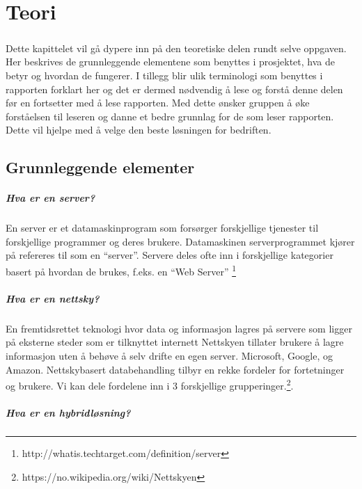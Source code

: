 \chapter{Teori}
\paragraph{} Dette kapittelet vil gå dypere inn på den teoretiske delen rundt selve oppgaven. Her beskrives de grunnleggende elementene som benyttes i prosjektet, hva de betyr og hvordan de fungerer. I tillegg blir ulik terminologi som benyttes i rapporten forklart her og det er dermed nødvendig å lese og forstå denne delen før en fortsetter med å lese rapporten. Med dette ønsker gruppen å øke forståelsen til leseren og danne et bedre grunnlag for de som leser rapporten. Dette vil hjelpe med å velge den beste løsningen for bedriften.
\section{Grunnleggende elementer}
\paragraph{Hva er en server?} 
En server er et datamaskinprogram som forsørger forskjellige tjenester til forskjellige programmer og deres brukere. Datamaskinen serverprogrammet kjører på refereres til som en “server”. Servere deles ofte inn i forskjellige kategorier basert på hvordan de brukes, f.eks. en “Web Server” \footnote{http://whatis.techtarget.com/definition/server}

\paragraph{Hva er en nettsky?}  

En fremtidsrettet teknologi hvor data og informasjon lagres på servere som ligger på eksterne steder som er tilknyttet internett Nettskyen tillater brukere å lagre informasjon uten å behøve å selv drifte en egen server. Microsoft, Google, og Amazon. Nettskybasert databehandling tilbyr en rekke fordeler for fortetninger og brukere. Vi kan dele fordelene inn i 3 forskjellige grupperinger.\footnote{https://no.wikipedia.org/wiki/Nettskyen}.

\paragraph{Hva er en hybridløsning?} 

